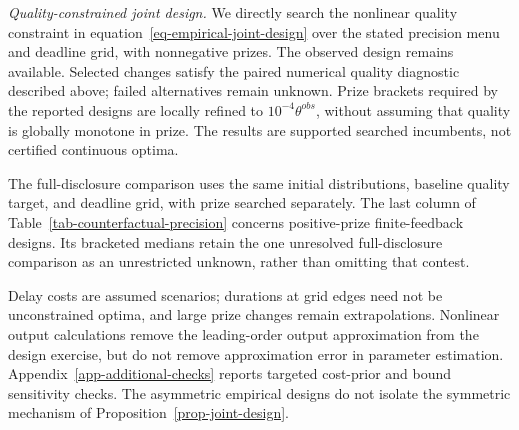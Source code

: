 \textit{Quality-constrained joint design.} We directly search the nonlinear quality constraint in equation~\eqref{eq-empirical-joint-design} over the stated precision menu and deadline grid, with nonnegative prizes. The observed design remains available. Selected changes satisfy the paired numerical quality diagnostic described above; failed alternatives remain unknown. Prize brackets required by the reported designs are locally refined to $10^{-4}\theta^{obs}$, without assuming that quality is globally monotone in prize. The results are supported searched incumbents, not certified continuous optima.

The full-disclosure comparison uses the same initial distributions, baseline quality target, and deadline grid, with prize searched separately. The last column of Table~\ref{tab-counterfactual-precision} concerns positive-prize finite-feedback designs. Its bracketed medians retain the one unresolved full-disclosure comparison as an unrestricted unknown, rather than omitting that contest.

Delay costs are assumed scenarios; durations at grid edges need not be unconstrained optima, and large prize changes remain extrapolations. Nonlinear output calculations remove the leading-order output approximation from the design exercise, but do not remove approximation error in parameter estimation. Appendix~\ref{app-additional-checks} reports targeted cost-prior and bound sensitivity checks. The asymmetric empirical designs do not isolate the symmetric mechanism of Proposition~\ref{prop-joint-design}.
